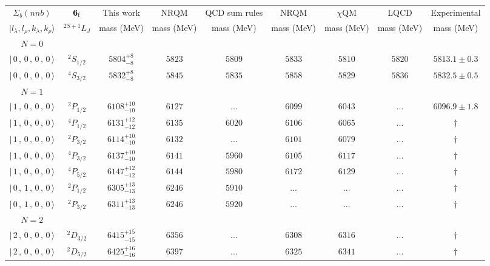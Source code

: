 \begin{tabular}{c c| c c c c c c c}\hline \hline
$\Sigma_{b}(nnb)$& ${\bf {6}}_{\rm f}$& This work   &   NRQM \cite{Yoshida2015}     &  QCD sum rules \cite{Liu2008, Mao2015, Chen2016}      &  NRQM \cite{Roberts2008}    & $\chi$QM \cite{Kim2021}        & LQCD \cite{Mohanta2020}     & Experimental  \\ 
 $\vert l_{\lambda}, l_{\rho}, k_{\lambda}, k_{\rho} \rangle$ & $^{2S+1}L_{J}$ & mass (MeV)  &   mass (MeV)  &  mass (MeV)  &  mass (MeV) & mass (MeV) & mass (MeV) &      mass (MeV) \\ \hline
\hline
 $N=0$  &  &  &  &  &  \\ 
$\vert \,0\,,\,0\,,\,0\,,\,0 \,\rangle $ & $^{2}S_{1/2}$ & $5804^{+8}_{-8}$ & $5823$ & $5809$ & $5833$ & $5810$ & $5820$ & $5813.1\pm 0.3$ \\ 
$\vert \,0\,,\,0\,,\,0\,,\,0 \,\rangle $ & $^{4}S_{3/2}$ & $5832^{+8}_{-8}$ & $5845$ & $5835$ & $5858$ & $5829$ & $5836$ & $5832.5\pm 0.5$ \\ 
\hline
 $N=1$  &  &  &  &  &  \\ 
$\vert \,1\,,\,0\,,\,0\,,\,0 \,\rangle $ & $^{2}P_{1/2}$ & $6108^{+10}_{-10}$ & $6127$ & ... & $6099$ & $6043$ & ... & $6096.9\pm 1.8$ \\ 
$\vert \,1\,,\,0\,,\,0\,,\,0 \,\rangle $ & $^{4}P_{1/2}$ & $6131^{+12}_{-12}$ & $6135$ & $6020$ & $6106$ & $6065$ & ... & $\dagger$ \\ 
$\vert \,1\,,\,0\,,\,0\,,\,0 \,\rangle $ & $^{2}P_{3/2}$ & $6114^{+10}_{-10}$ & $6132$ & ... & $6101$ & $6079$ & ... & $\dagger$ \\ 
$\vert \,1\,,\,0\,,\,0\,,\,0 \,\rangle $ & $^{4}P_{3/2}$ & $6137^{+10}_{-10}$ & $6141$ & $5960$ & $6105$ & $6117$ & ... & $\dagger$ \\ 
$\vert \,1\,,\,0\,,\,0\,,\,0 \,\rangle $ & $^{4}P_{5/2}$ & $6147^{+12}_{-12}$ & $6144$ & $5980$ & $6172$ & $6129$ & ... & $\dagger$ \\ 
$\vert \,0\,,\,1\,,\,0\,,\,0 \,\rangle $ & $^{2}P_{1/2}$ & $6305^{+13}_{-13}$ & $6246$ & $5910$ & ... & ... & ... & $\dagger$ \\ 
$\vert \,0\,,\,1\,,\,0\,,\,0 \,\rangle $ & $^{2}P_{3/2}$ & $6311^{+13}_{-13}$ & $6246$ & $5920$ & ... & ... & ... & $\dagger$ \\ 
\hline
 $N=2$  &  &  &  &  &  \\ 
$\vert \,2\,,\,0\,,\,0\,,\,0 \,\rangle $ & $^{2}D_{3/2}$ & $6415^{+15}_{-15}$ & $6356$ & ... & $6308$ & $6316$ & ... & $\dagger$ \\ 
$\vert \,2\,,\,0\,,\,0\,,\,0 \,\rangle $ & $^{2}D_{5/2}$ & $6425^{+16}_{-16}$ & $6397$ & ... & $6325$ & $6341$ & ... & $\dagger$ \\ 

\end{tabular}
